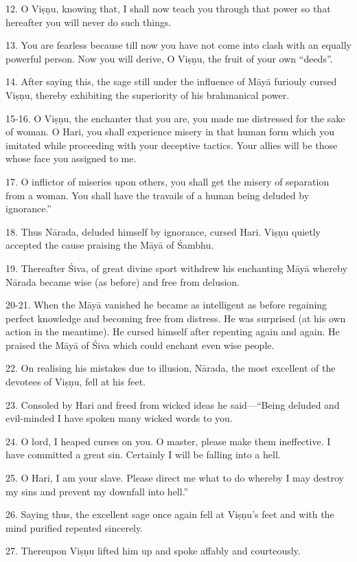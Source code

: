 12. O Viṣṇu, knowing that, I shall now teach you through that power so that
hereafter you will never do such things.

13. You are fearless because till now you have not come into clash with an
equally powerful person. Now you will derive, O Viṣṇu, the fruit of your own
“deeds”.

14. After saying this, the sage still under the influence of Māyā furiouly
cursed Viṣṇu, thereby exhibiting the superiority of his brahmanical power.

15-16. O Viṣṇu, the enchanter that you are, you made me distressed for the sake
of woman. O Hari, you shall experience misery in that human form which you
imitated while proceeding with your deceptive tactics. Your allies will be those
whose face you assigned to me.

17. O inflictor of miseries upon others, you shall get the misery of separation
from a woman. You shall have the travails of a human being deluded by ignorance.”

18. Thus Nārada, deluded himself by ignorance, cursed Hari. Viṣṇu quietly
accepted the cause praising the Māyā of Śambhu.

19. Thereafter Śiva, of great divine sport withdrew his enchanting Māyā whereby
Nārada became wise (as before) and free from delusion.

20-21. When the Māyā vanished he became as intelligent as before regaining
perfect knowledge and becoming free from distress. He was surprised (at his own
action in the meantime). He cursed himself after repenting again and again. He
praised the Māyā of Śiva which could enchant even wise people.

22. On realising his mistakes due to illusion, Nārada, the most excellent of
the devotees of Viṣṇu, fell at his feet.

23. Consoled by Hari and freed from wicked ideas he said—“Being deluded and
evil-minded I have spoken many wicked words to you.

24. O lord, I heaped curses on you. O master, please make them ineffective.
I have committed a great sin. Certainly I will be falling into a hell.

25. O Hari, I am your slave. Please direct me what to do whereby I may destroy
my sins and prevent my downfall into hell.”

26. Saying thus, the excellent sage once again fell at Viṣṇu’s feet and with
the mind purified repented sincerely.

27. Thereupon Viṣṇu lifted him up and spoke affably and courteously.

